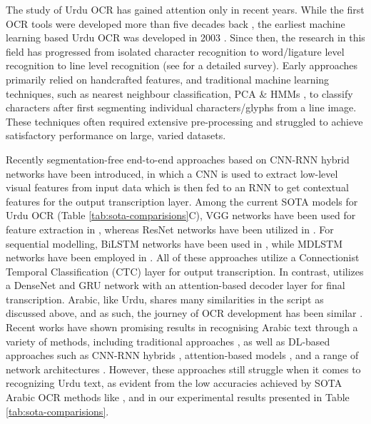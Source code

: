 \documentclass[runningheads]{llncs}
\begin{document}
The study of Urdu OCR has gained attention only in recent years. While the first OCR tools were developed more than five decades back \cite{surveyurdu1}, the earliest machine learning based Urdu OCR was developed in 2003 \cite{firsturduocr}. Since then, the research in this field has progressed from isolated character recognition to word/ligature level recognition to line level recognition (see \cite{surveyurdu1,surveyurdu2,surveyurdu3} for a detailed survey). Early approaches primarily relied on handcrafted features, and traditional machine learning techniques, such as nearest neighbour classification, PCA \& HMMs \cite{char_urdu_ocr2,char_urdu_ocr3,old_urdu0cr_1,lm_urdu_ocr}, to classify characters after first segmenting individual characters/glyphs from a line image. These techniques often required extensive pre-processing and struggled to achieve satisfactory performance on large, varied datasets. 

Recently segmentation-free end-to-end approaches based on CNN-RNN hybrid networks \cite{iiith17urdu} have been introduced, in which a CNN \cite{cnn_for_features} is used to extract low-level visual features from input data which is then fed to an RNN \cite{rnn_for_sequence} to get contextual features for the output transcription layer. Among the current SOTA models for Urdu OCR (Table \ref{tab:sota-comparisions}C), VGG networks \cite{vgg_orig} have been used for feature extraction in \cite{iiith17urdu,mdlstm_urdu_ocr,mdlstm_urdu_ocr2}, whereas ResNet networks \cite{resnet_orig} have been utilized in \cite{resnet_urdu_ocr}. For sequential modelling, BiLSTM networks \cite{bilsm_orig} have been used in \cite{iiith17urdu,resnet_urdu_ocr}, while MDLSTM networks \cite{mdlstm_orig} have been employed in \cite{mdlstm_urdu_ocr,mdlstm_urdu_ocr2}. All of these approaches utilize a Connectionist Temporal Classification (CTC) layer \cite{ctc_paper} for output transcription. In contrast, \cite{gru_attn_paper} utilizes a DenseNet \cite{densenet_orig} and GRU network \cite{gru_orig} with an attention-based decoder layer \cite{attn_decoder_orig} for final transcription. Arabic, like Urdu, shares many similarities in the script as discussed above, and as such, the journey of OCR development has been similar \cite{iiith17arabic,surveyArabicOCR}. Recent works have shown promising results in recognising Arabic text through a variety of methods, including traditional approaches \cite{isolated_arabic_2017,seg_hybrid_arabic_2017}, as well as DL-based approaches such as CNN-RNN hybrids \cite{arabic_hybrid_cnn_rnn_blstm,iiith17arabic}, attention-based models \cite{arabic_attention_encoder_decoder_2021,Arabic_attention_cnn_rnn}, and a range of network architectures \cite{arabic_mdlstm_lr,arabic_mdlstm_2008,arabic_mdbsltm_2018,arabic_OCFormer}. However, these approaches still struggle when it comes to recognizing Urdu text, as evident from the low accuracies achieved by SOTA Arabic OCR methods like \cite{arabic_hybrid_cnn_rnn_blstm}, \cite{arabic_attention_encoder_decoder_2021} and \cite{Arabic_attention_cnn_rnn} in our experimental results presented in Table \ref{tab:sota-comparisions}.
\end{document}
